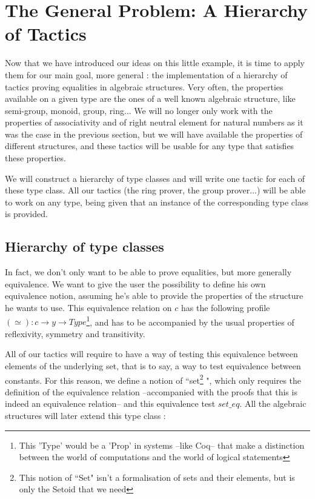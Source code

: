 \section{The General Problem: A Hierarchy of Tactics}

\label{sect:general}

Now that we have introduced our ideas on this little example, it is time to apply them for our main goal, more general : the implementation of a hierarchy of tactics proving equalities in algebraic structures. Very often, the properties available on a given type are the ones of a well known algebraic structure, like semi-group, monoid, group, ring...  We will no longer only work with the properties of associativity and of right neutral element for natural numbers as it was the case in the previous section, but we will have available the properties of different structures, and these tactics will be usable for any type that satisfies these properties.

We will construct a hierarchy of type classes and will write one tactic for each of these type class. All our tactics (the ring prover, the group prover...) will be able to work on any type, being given that an instance of the corresponding type class is provided.

\subsection {Hierarchy of type classes}

In fact, we don't only want to be able to prove equalities, but more generally equivalence. We want to give the user the possibility to define his own equivalence notion, assuming he's able to provide the properties of the structure he wants to use. This equivalence relation on $c$ has the following profile $(\simeq) : c \rightarrow y \rightarrow Type$\footnote{This 'Type' would be a 'Prop' in systems --like Coq-- that make a distinction between the world of computations and the world of logical statements}, and has to be accompanied by the usual properties of reflexivity, symmetry and transitivity.

All of our tactics will require to have a way of testing this equivalence between elements of the underlying set, that is to say, a way to test equivalence between constants. For this reason, we define a notion of ``set\footnote{This notion of ``Set" isn't a formalisation of sets and their elements, but is only the Setoid that we need} ", which only requires the definition of the equivalence relation --accompanied with the proofs that this is indeed an equivalence relation-- and this equivalence test $set\_eq$. All the algebraic structures will later extend this type class :

